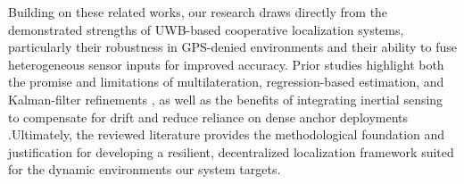 \noindent Building on these related works, our research draws directly from the demonstrated strengths of UWB-based cooperative localization systems, particularly their robustness in GPS-denied environments and their ability to fuse heterogeneous sensor inputs for improved accuracy. Prior studies highlight both the promise and limitations of multilateration, regression-based estimation, and Kalman-filter refinements \cite{AdHocMeshNetworkLocalizationUsinUltra-WidebandForMobileRobotics}, as well as the benefits of integrating inertial sensing to compensate for drift and reduce reliance on dense anchor deployments \cite{ANovelCooperativeLocalizationMethodBasedonIMUandUWB}.Ultimately, the reviewed literature provides the methodological foundation and justification for developing a resilient, decentralized localization framework suited for the dynamic environments our system targets. 

